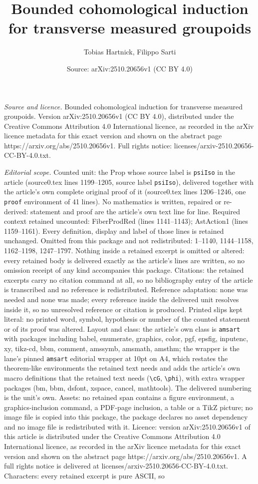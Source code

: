 \documentclass[10pt,a4paper]{amsart}
\title[Bounded cohomological induction for transverse measured grou]{Bounded cohomological induction for transverse measured groupoids}
\author{Tobias Hartnick, Filippo Sarti}
\date{Source: arXiv:2510.20656v1 (CC BY 4.0)}
\begin{document}
\maketitle

\noindent\emph{Source and licence.} Bounded cohomological induction for transverse measured groupoids. Version arXiv:2510.20656v1 (CC BY 4.0), distributed under the Creative Commons Attribution 4.0 International licence, as recorded in the arXiv licence metadata for this exact version and shown on the abstract page https://arxiv.org/abs/2510.20656v1. Full rights notice: licenses/arxiv-2510.20656-CC-BY-4.0.txt.\par\smallskip

\noindent\textit{Editorial scope.} Counted unit: the Prop whose source label is \texttt{psiIso} in the article (source0.tex lines 1199--1205, source label \texttt{psiIso}), delivered together with the article's own complete original proof of it (source0.tex lines 1206--1246, one \texttt{proof} environment of 41 lines). No mathematics is written, repaired or re-derived: statement and proof are the article's own text line for line. Required context retained uncounted: FiberProdRed (lines 1141--1143); AstAction1 (lines 1159--1161). Every definition, display and label of those lines is retained unchanged. Omitted from this package and not redistributed: 1--1140, 1144--1158, 1162--1198, 1247--1797. Nothing inside a retained excerpt is omitted or altered: every retained body is delivered exactly as the article's lines are written, so no omission receipt of any kind accompanies this package. Citations: the retained excerpts carry no citation command at all, so no bibliography entry of the article is transcribed and no reference is redistributed. Reference adaptation: none was needed and none was made; every reference inside the delivered unit resolves inside it, so no unresolved reference or citation is produced. Printed slips kept literal: no printed word, symbol, hypothesis or number of the counted statement or of its proof was altered. Layout and class: the article's own class is \texttt{amsart} with packages including babel, enumerate, graphics, color, pgf, epsfig, inputenc, xy, tikz-cd, bbm, comment, amssymb, amsmath, amsthm; the wrapper is the lane's pinned \texttt{amsart} editorial wrapper at 10pt on A4, which restates the theorem-like environments the retained text needs and adds the article's own macro definitions that the retained text needs (\texttt{\textbackslash cG}, \texttt{\textbackslash phi}), with extra wrapper packages (bm, bbm, dsfont, xspace, cancel, mathtools). The delivered numbering is the unit's own. Assets: no retained span contains a figure environment, a graphics-inclusion command, a PDF-page inclusion, a table or a TikZ picture; no image file is copied into this package, the package declares no asset dependency and no image file is redistributed with it. Licence: version arXiv:2510.20656v1 of this article is distributed under the Creative Commons Attribution 4.0 International licence, as recorded in the arXiv licence metadata for this exact version and shown on the abstract page https://arxiv.org/abs/2510.20656v1. A full rights notice is delivered at licenses/arxiv-2510.20656-CC-BY-4.0.txt. Characters: every retained excerpt is pure ASCII, so 
\end{document}
